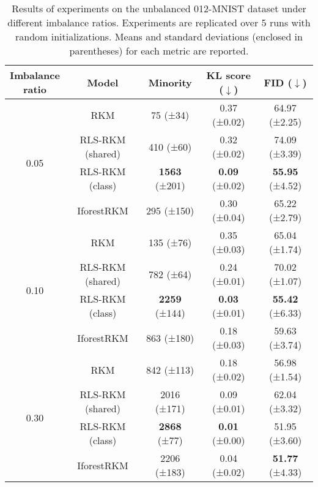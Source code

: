 \begin{table}[htb]
    \centering
    \begin{tabular}{ccccc}
\toprule
\makecell{Imbalance \\ ratio} & Model & Minority & KL score ($\downarrow$) & FID ($\downarrow$) \\
\midrule
\multirow{4}{*}{0.05} & RKM & 75 (±34) & 0.37 (±0.02) & 64.97 (±2.25) \\
& RLS-RKM (shared) & 410 (±60) & 0.32 (±0.02) & 74.09 (±3.39) \\
& RLS-RKM (class) & \textbf{1563} (±201) & \textbf{0.09} (±0.02) & \textbf{55.95} (±4.52) \\
& IforestRKM & 295 (±150) & 0.30 (±0.04) & 65.22 (±2.79) \\
\midrule
\multirow{4}{*}{0.10} & RKM & 135 (±76) & 0.35 (±0.03) & 65.04 (±1.74) \\
& RLS-RKM (shared) & 782 (±64) & 0.24 (±0.01) & 70.02 (±1.07) \\
& RLS-RKM (class) & \textbf{2259} (±144) & \textbf{0.03} (±0.01) & \textbf{55.42} (±6.33) \\
& IforestRKM & 863 (±180) & 0.18 (±0.03) & 59.63 (±3.74) \\
\midrule
\multirow{4}{*}{0.30} & RKM & 842 (±113) & 0.18 (±0.02) & 56.98 (±1.54) \\
& RLS-RKM (shared) & 2016 (±171) & 0.09 (±0.01) & 62.04 (±3.32) \\
& RLS-RKM (class) & \textbf{2868} (±77) & \textbf{0.01} (±0.00) & 51.95 (±3.60) \\
& IforestRKM & 2206 (±183) & 0.04 (±0.02) & \textbf{51.77} (±4.33) \\
\bottomrule
\end{tabular}
    \caption{Results of experiments on the unbalanced 012-MNIST dataset under different imbalance ratios. Experiments are replicated over 5 runs with random initializations. Means and standard deviations (enclosed in parentheses) for each metric are reported.}
    \label{expr-mnist012}
\end{table}